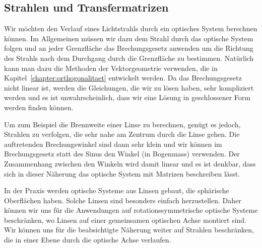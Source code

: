 %
%
%
\subsection{Strahlen und Transfermatrizen
\label{mo:subsection:transfermatrizen}}
Wir möchten den Verlauf eines Lichtstrahls durch ein optisches System
berechnen können.
Im Allgemeinen müssen wir dazu dem Strahl durch das optische System
folgen und an jeder Grenzfläche das Brechungsgesetz anwenden um die
Richtung des Strahls nach dem Durchgang durch die Grenzfläche zu
bestimmen.
Natürlich kann man dazu die Methoden der Vektorgeometrie verwenden,
die in Kapitel~\ref{chapter:orthogonalitaet} entwickelt werden.
Da das Brechungsgesetz nicht linear ist, werden die Gleichungen, die
wir zu lösen haben, sehr kompliziert werden und es ist unwahrscheinlich,
dass wir eine Lösung in geschlossener Form werden finden können.

Um zum Beispiel die Brennweite einer Linse zu berechnen, genügt es jedoch,
Strahlen zu verfolgen, die sehr nahe am Zentrum durch die Linse gehen.
Die auftretenden Brechungswinkel sind dann sehr klein und wir können im
Brechungsgesetz statt des Sinus den Winkel (in Bogenmass) verwenden.
Der Zusammenhang zwischen den Winkeln wird damit linear und es ist 
denkbar, dass sich in dieser Näherung das optische System mit Matrizen
beschreiben lässt.

In der Praxis werden optische Systeme aus Linsen gebaut, die 
sphärische Oberflächen haben.
Solche Linsen sind besonders einfach herzustellen.
Daher können wir uns für die Anwendungen auf rotationssymmetrische
optische Systeme beschränken, wo Linsen auf einer gemeinsamen
optischen Achse montiert sind.
Wir können uns für die beabsichtigte Näherung weiter auf Strahlen
beschränken, die in einer Ebene durch die optische Achse verlaufen.

